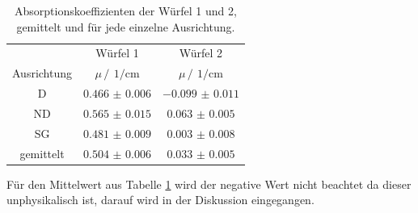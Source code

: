 \begin{table}
    \centering
    \caption{Absorptionskoeffizienten der Würfel 1 und 2, gemittelt und für jede einzelne Ausrichtung.}
    \label{tab:Absorptionskoeffizienten_1_2}
    \begin{tabular}{c c c}
        \toprule
        &Würfel 1&Würfel 2\\
        \cmidrule(lr){2-2}\cmidrule(lr){3-3}
        Ausrichtung&$\mu \,/\,\SI{}{1\per\centi\meter}$&$\mu \,/\,\SI{}{1\per\centi\meter}$\\
        \midrule
        D &$\num{0.466(6)}$&$\num{-0.099(11)}$\\
        ND&$\num{0.565(15)}$&$\num{0.063(5)}$\\
        SG&$\num{0.481(9)}$&$\num{0.003(8)}$\\
        \midrule
        gemittelt&$\num{0.504(6)}$&$\num{0.033(5)}$\\
        \bottomrule
    \end{tabular}
\end{table}
\FloatBarrier
Für den Mittelwert aus Tabelle \ref{tab:Absorptionskoeffizienten_1_2} wird der negative Wert nicht beachtet da dieser unphysikalisch ist,
darauf wird in der Diskussion eingegangen.
